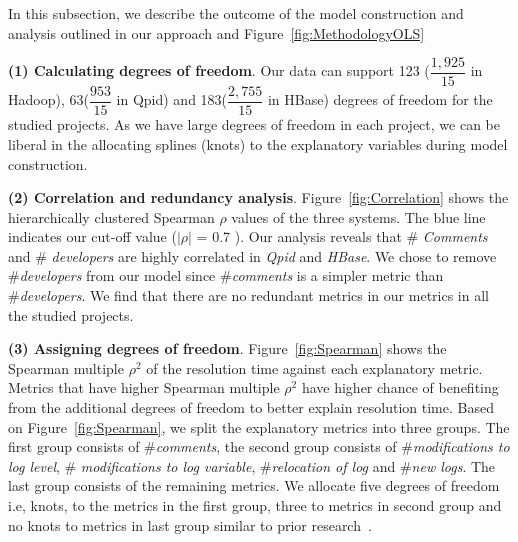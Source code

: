 In this subsection, we describe the outcome of the model construction and analysis outlined in our approach and Figure~\ref{fig:MethodologyOLS}

\textbf{(1) Calculating degrees of freedom}. Our data can support 123 ($\dfrac{1,925}{15}$ in Hadoop), 63($\dfrac{953}{15}$ in Qpid) and 183($\dfrac{2,755}{15} $ in HBase) degrees of freedom for the studied projects. As we have large degrees of freedom in each project, we can be liberal in the allocating splines (knots) to the explanatory variables during model construction. 


\textbf{{(2) Correlation and redundancy analysis}}. Figure~\ref{fig:Correlation} shows the hierarchically clustered Spearman $\rho$ values of the three systems. The blue line indicates our cut-off value ($|\rho|$ = 0.7 ). Our analysis reveals that \# \textsl{Comments} and \# \textsl{developers} are highly correlated in \emph{Qpid} and \emph{HBase}. We chose to remove \#\textsl{developers} from our model since \#\textsl{comments} is a simpler metric than \#\textsl{developers}. We find that there are no redundant metrics in our metrics in all the studied projects.


\textbf{(3) Assigning degrees of freedom}. Figure~\ref{fig:Spearman} shows the Spearman multiple $\rho^{2}$ of the resolution time against each explanatory metric. Metrics that have higher Spearman multiple $\rho^{2}$ have higher chance of benefiting from the additional degrees of freedom to better explain resolution time. Based on Figure~\ref{fig:Spearman}, we split the explanatory metrics into three groups. The first group consists of \#\textsl{comments}, the second group consists of \#\textsl{modifications to log level}, \#\textsl{ modifications to log variable}, \#\textsl{relocation of log} and \#\textsl{new logs}. The last group consists of the remaining metrics. We allocate five degrees of freedom i.e, knots, to the metrics in the first group, three to metrics in second group and no knots to metrics in last group similar to prior research~\cite{ShaneOLS}.


